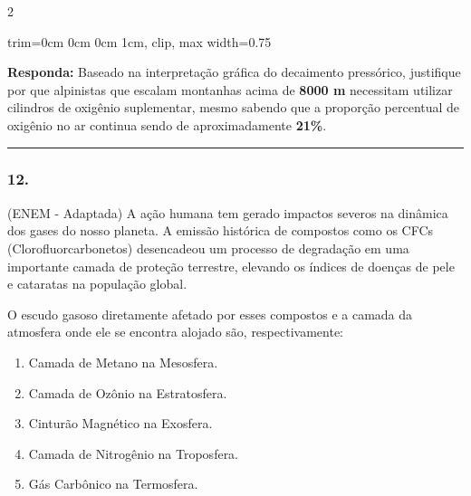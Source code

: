 \documentclass[twoside, 10pt, a4paper]{article}
\newlength{\espacoPreQuestao}
\newlength{\espacoQuestao}
\newlength{\espacoAlt}
\begin{document}
\begin{multicols*}{2}
\begin{center}
\begin{adjustbox}{trim=0cm 0cm 0cm 1cm, clip, max width={0.75\linewidth}}
\end{adjustbox}
\end{center}

\begin{boxresponda}
\textbf{Responda:} Baseado na interpretação gráfica do decaimento pressórico, justifique por que alpinistas que escalam montanhas acima de \textbf{8000 m} necessitam utilizar cilindros de oxigênio suplementar, mesmo sabendo que a proporção percentual de oxigênio no ar continua sendo de aproximadamente \textbf{21\%}.
\end{boxresponda}
\par\vspace{\espacoQuestao}

\noindent\textcolor{CorLinha}{\rule{\linewidth}{0.5pt}} 
\par\vspace{\espacoPreQuestao}
\subsubsection*{12.} (ENEM - Adaptada) A ação humana tem gerado impactos severos na dinâmica dos gases do nosso planeta. A emissão histórica de compostos como os CFCs (Clorofluorcarbonetos) desencadeou um processo de degradação em uma importante camada de proteção terrestre, elevando os índices de doenças de pele e cataratas na população global. 

O escudo gasoso diretamente afetado por esses compostos e a camada da atmosfera onde ele se encontra alojado são, respectivamente:

\begin{enumerate}[label=\alph*), itemsep=\espacoAlt]
\item Camada de Metano na Mesosfera.
\item Camada de Ozônio na Estratosfera.
\item Cinturão Magnético na Exosfera.
\item Camada de Nitrogênio na Troposfera.
\item Gás Carbônico na Termosfera.
\end{enumerate}
\par\vspace{\espacoQuestao}

\end{multicols*}
\end{document}
